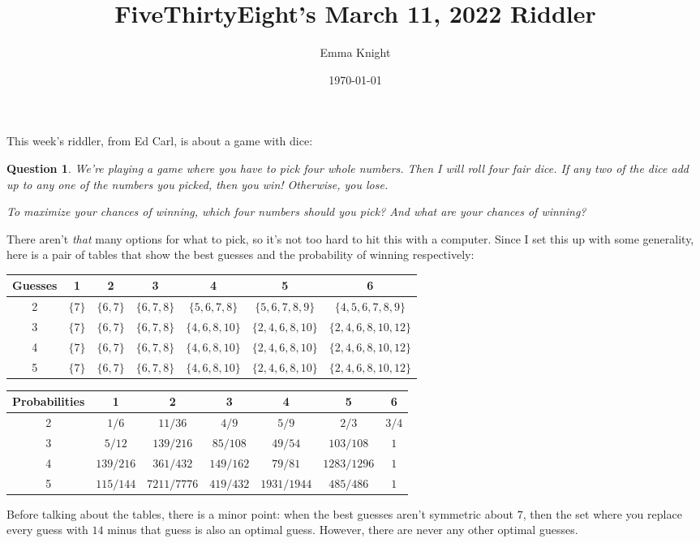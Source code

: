 \documentclass[11pt]{article}
\title{FiveThirtyEight's March 11, 2022 Riddler}
\author{Emma Knight}
\date{\today}
\newtheorem{question}[theorem]{Question}
\theoremstyle{definition}
\begin{document}
\maketitle
This week's riddler, from Ed Carl, is about a game with dice:
\begin{question}
We’re playing a game where you have to pick four whole numbers. Then I will roll four fair dice. If any two of the dice add up to any one of the numbers you picked, then you win! Otherwise, you lose.

To maximize your chances of winning, which four numbers should you pick? And what are your chances of winning?
\end{question}
There aren't \emph{that} many options for what to pick, so it's not too hard to hit this with a computer.  Since I set this up with some generality, here is a pair of tables that show the best guesses and the probability of winning respectively:
 
\begin{tabular}{c||c|c|c|c|c|c|}
Guesses & 1 &2 &3 & 4 & 5 & 6 \\ \hline \hline
2 & $\{7\}$ & $\{6, 7\}$ & $\{6, 7, 8\}$ & $\{5, 6, 7, 8\}$&$\{ 5, 6, 7, 8, 9\}$&$\{4, 5, 6, 7,8 ,9\}$ \\ \hline
3 & $\{7 \}$ & $\{6, 7 \}$& $\{6,7, 8 \}$& $\{4,6,8,10 \}$& $\{2, 4, 6, 8, 10 \}$& $\{2, 4, 6, 8, 10, 12 \}$ \\ \hline
4 & $\{7 \}$ & $\{6, 7 \}$& $\{6,7, 8 \}$& $\{4,6,8,10 \}$& $\{2, 4, 6, 8, 10 \}$& $\{2, 4, 6, 8, 10, 12 \}$ \\ \hline
5 & $\{7 \}$ & $\{6, 7 \}$& $\{6,7, 8 \}$& $\{4,6,8,10 \}$& $\{2, 4, 6, 8, 10 \}$& $\{2, 4, 6, 8, 10, 12 \}$ \\ \hline
\end{tabular}

\begin{tabular}{c||c|c|c|c|c|c|}
Probabilities& 1 &2 &3 & 4 & 5 & 6 \\ \hline \hline
2 & $1/6$ & $11/36$ & $4/9$ & $5/9$ & $2/3$ & $3/4$ \\ \hline
3 & $5/12$ & $139/216$ & $85/108$ & $49/54$ & $103/108$ & $1$ \\ \hline
4 & $139/216$ & $361/432$ & $149/162$ & $79/81$ & $1283/1296$ & $1$ \\ \hline
5 & $115/144$ & $7211/7776$ & $419/432$ & $1931/1944$ & $485/486$ & $1$ \\ \hline
\end{tabular}

Before talking about the tables, there is a minor point: when the best guesses aren't symmetric about $7$, then the set where you replace every guess with $14$ minus that guess is also an optimal guess.  However, there are never any other optimal guesses.
\end{document}
